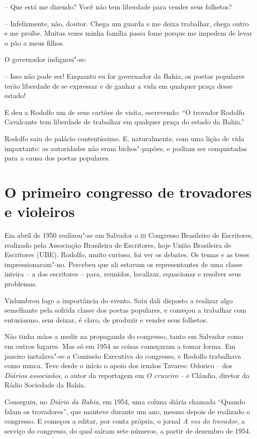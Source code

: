  -- Que está me dizendo? Você não tem liberdade para vender seus
folhetos? 

 -- Infelizmente, não, doutor. Chega um guarda e me deixa trabalhar,
chega outro e me proíbe. Muitas vezes minha família passa fome porque
me impedem de levar o pão a meus filhos. 

 O governador indignou"-se: 

 -- Isso não pode ser! Enquanto eu for governador da Bahia, os poetas
populares terão liberdade de se expressar e de ganhar a vida em
qualquer praça desse estado! 

 E deu a Rodolfo um de seus cartões de visita, escrevendo:
``O trovador Rodolfo Cavalcante tem liberdade de trabalhar
em qualquer praça do estado da Bahia.'' 

 Rodolfo saiu do palácio contentíssimo. E, naturalmente, com uma lição
de vida importante: as autoridades não eram bichos"-papões, e podiam
ser conquistadas para a causa dos poetas populares. 

\section{O primeiro congresso de trovadores e violeiros}

 Em abril de 1950 realizou"-se em Salvador o \textsc{iii} Congresso Brasileiro
de Escritores, realizado pela Associação Brasileira de Escritores, hoje
União Brasileira de Escritores (UBE). Rodolfo, muito curioso, foi ver
os debates. Os temas e as teses impressionaram"-no. Percebeu que ali
estavam os representantes de uma classe inteira -- a dos escritores
-- para, reunidos, localizar, equacionar e resolver seus problemas. 

 Vislumbrou logo a importância do evento. Saiu dali disposto a realizar
algo semelhante pela sofrida classe dos poetas populares, e começou a
trabalhar com entusiasmo, sem deixar, é claro, de produzir e vender
seus folhetos. 

 Não tinha mãos a medir na propaganda do congresso, tanto em Salvador
como em outros lugares. Mas só em 1954 as coisas começaram a tomar
forma. Em janeiro instalava"-se a Comissão Executiva do congresso, e
Rodolfo trabalhava como nunca. Teve desde o início o apoio dos irmãos
Tavares: Odorico -- dos \textit{Diários associados}, o autor da
reportagem em \textit{O cruzeiro} -- e Cláudio, diretor da Rádio
Sociedade da Bahia. 

 Conseguiu, no \textit{Diário da Bahia}, em 1954, uma coluna diária
chamada ``Quando falam os trovadores'', que
manteve durante um ano, mesmo depois de realizado o congresso. E
começou a editar, por conta própria, o jornal \textit{A voz do
trovador}, a serviço do congresso, do qual saíram sete números, a
partir de dezembro de 1954. 

